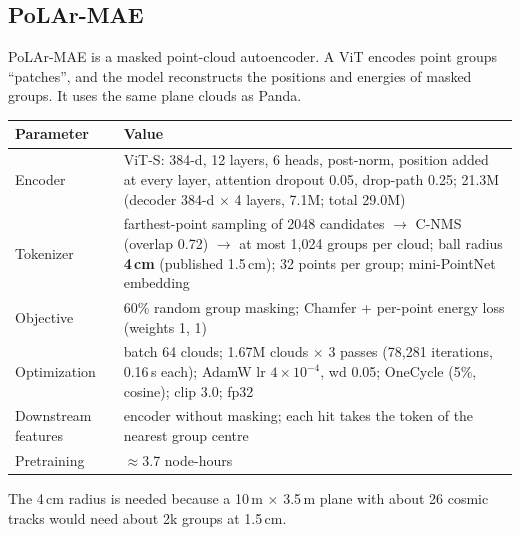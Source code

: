 \documentclass[11pt,a4paper]{article}
\begin{document}
\subsection{PoLAr-MAE~\cite{polarmae}}
PoLAr-MAE is a masked point-cloud autoencoder. A ViT encodes point groups ``patches'', and the model reconstructs the positions and energies of masked groups. It uses the same plane clouds as Panda.
\begin{center}\small
\begin{tabularx}{\textwidth}{lL}
\toprule
Parameter & Value\\
\midrule
Encoder & ViT-S: 384-d, 12 layers, 6 heads, post-norm, position added at every layer, attention dropout 0.05, drop-path 0.25; 21.3M (decoder 384-d $\times$ 4 layers, 7.1M; total 29.0M)\\
Tokenizer & farthest-point sampling of 2048 candidates $\to$ C-NMS (overlap 0.72) $\to$ at most 1{,}024 groups per cloud; ball radius \textbf{4\,cm} (published 1.5\,cm); 32 points per group; mini-PointNet embedding\\
Objective & 60\% random group masking; Chamfer + per-point energy loss (weights 1, 1)\\
Optimization & batch 64 clouds; 1.67M clouds $\times$ 3 passes (78{,}281 iterations, 0.16\,s each); AdamW lr $4\times10^{-4}$, wd 0.05; OneCycle (5\%, cosine); clip 3.0; fp32\\
Downstream features & encoder without masking; each hit takes the token of the nearest group centre\\
Pretraining & $\approx$3.7 node-hours\\
\bottomrule
\end{tabularx}
\end{center}
The 4\,cm radius is needed because a 10\,m $\times$ 3.5\,m plane with about 26 cosmic tracks would need about 2k groups at 1.5\,cm.
\end{document}

